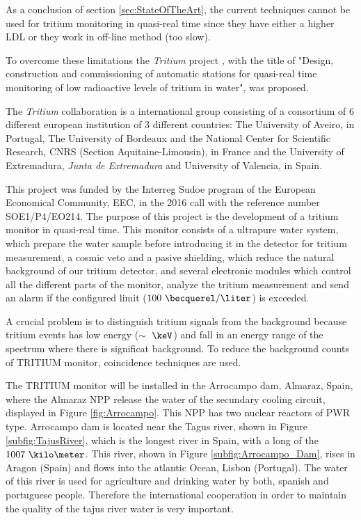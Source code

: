 As a conclusion of section \ref{sec:StateOfTheArt}, the current techniques cannot be used for tritium monitoring in quasi-real time since they have either a higher LDL or they work in off-line method (too slow). 

To overcome these limitations the \textit{Tritium} project \cite{TRITIUM}, with the title of "Design, construction and commissioning of automatic stations for quasi-real time monitoring of low radioactive levels of tritium in water", was proposed.

The \textit{Tritium} collaboration is a international group consisting of a consortium of 6 different european institution of 3 different countries: The University of Aveiro, in Portugal, The University of Bordeaux and the National Center for Scientific Research, CNRS  (Section Aquitaine-Limousin), in France and the University of Extremadura, \textit{Junta de Extremadura} and University of Valencia, in Spain.

This project was funded by the Interreg Sudoe program of the European Economical Community, EEC, in the 2016 call with the reference number SOE1/P4/EO214. The purpose of this project is the development of a tritium monitor in quasi-real time. This monitor consists of a ultrapure water system, which prepare the water sample before introducing it in the detector for tritium measurement, a cosmic veto and a pasive shielding, which reduce the natural background of our tritium detector, and several electronic modules which control all the different parts of the monitor, analyze the tritium measurement and send an alarm if the configured limit ($100~\becquerel/\liter$) is exceeded.

A crucial problem is to distinguish tritium signals from the background because tritium events has low energy ($\sim~\keV$) and fall in an energy range of the spectrum where there is significat background. To reduce the background counts of TRITIUM monitor, coincidence techniques are used.


The TRITIUM monitor will be installed in the Arrocampo dam, Almaraz, Spain, where the Almaraz NPP release the water of the secundary cooling circuit, displayed in Figure \ref{fig:Arrocampo}. This NPP has two nuclear reactors of PWR type. Arrocampo dam is located near the Tagus river, shown in Figure \ref{subfig:TajusRiver}, which is the longest river in Spain, with a long of the $1007~\kilo\meter$. This river, shown in Figure \ref{subfig:Arrocampo_Dam}, rises in Aragon (Spain) and flows into the atlantic Ocean, Lisbon (Portugal). The water of this river is used for agriculture and drinking water by both, spanish and portuguese people. Therefore the international cooperation in order to maintain the quality of the tajus river water is very important.

